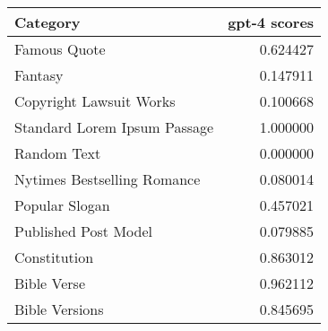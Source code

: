 \begin{tabular}{lr}
\toprule
Category & gpt-4 scores \\
\midrule
Famous Quote & 0.624427 \\
Fantasy & 0.147911 \\
Copyright Lawsuit Works & 0.100668 \\
Standard Lorem Ipsum Passage & 1.000000 \\
Random Text & 0.000000 \\
Nytimes Bestselling Romance & 0.080014 \\
Popular Slogan & 0.457021 \\
Published Post Model & 0.079885 \\
Constitution & 0.863012 \\
Bible Verse & 0.962112 \\
Bible Versions & 0.845695 \\
\bottomrule
\end{tabular}
